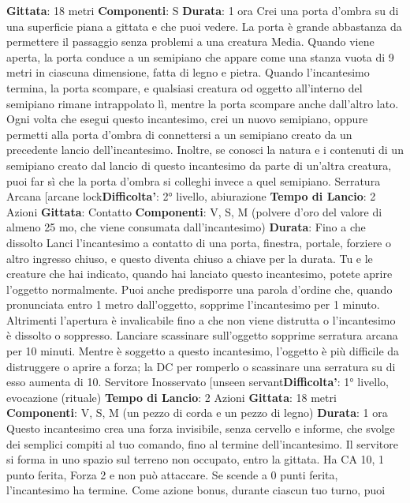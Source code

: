 \begin{multicols}{2}
\textbf{Gittata}: 18 metri
\textbf{Componenti}: S
\textbf{Durata}: 1 ora
Crei una porta d’ombra su di una superficie piana a
gittata e che puoi vedere. La porta è grande
abbastanza da permettere il passaggio senza problemi
a una creatura Media. Quando viene aperta, la porta
conduce a un semipiano che appare come una stanza
vuota di 9 metri in ciascuna dimensione, fatta di legno e
pietra. Quando l’incantesimo termina, la porta
scompare, e qualsiasi creatura od oggetto all’interno del
semipiano rimane intrappolato lì, mentre la porta
scompare anche dall’altro lato.
Ogni volta che esegui questo incantesimo, crei un
nuovo semipiano, oppure permetti alla porta d’ombra di
connettersi a un semipiano creato da un precedente
lancio dell’incantesimo. Inoltre, se conosci la natura e i
contenuti di un semipiano creato dal lancio di questo
incantesimo da parte di un’altra creatura, puoi far sì che
la porta d’ombra si colleghi invece a quel semipiano.
Serratura Arcana
[arcane lock\textbf{Difficolta'}:
2° livello, abiurazione
\textbf{Tempo di Lancio}: 2 Azioni
\textbf{Gittata}: Contatto
\textbf{Componenti}: V, S, M (polvere d’oro del valore di
almeno 25 mo, che viene consumata dall’incantesimo)
\textbf{Durata}: Fino a che dissolto
Lanci l’incantesimo a contatto di una porta, finestra,
portale, forziere o altro ingresso chiuso, e questo
diventa chiuso a chiave per la durata. Tu e le creature
che hai indicato, quando hai lanciato questo
incantesimo, potete aprire l’oggetto normalmente. Puoi
anche predisporre una parola d’ordine che, quando
pronunciata entro 1 metro dall’oggetto, sopprime
l’incantesimo per 1 minuto. Altrimenti l’apertura è
invalicabile fino a che non viene distrutta o
l’incantesimo è dissolto o soppresso. Lanciare
scassinare sull’oggetto sopprime serratura arcana per
10 minuti.
Mentre è soggetto a questo incantesimo, l’oggetto è più
difficile da distruggere o aprire a forza; la DC per
romperlo o scassinare una serratura su di esso
aumenta di 10.
Servitore Inosservato
[unseen servant\textbf{Difficolta'}:
1° livello, evocazione (rituale)
\textbf{Tempo di Lancio}: 2 Azioni
\textbf{Gittata}: 18 metri
\textbf{Componenti}: V, S, M (un pezzo di corda e un pezzo di
legno)
\textbf{Durata}: 1 ora
Questo incantesimo crea una forza invisibile, senza
cervello e informe, che svolge dei semplici compiti al
tuo comando, fino al termine dell’incantesimo. Il
servitore si forma in uno spazio sul terreno non
occupato, entro la gittata. Ha CA 10, 1 punto ferita,
Forza 2 e non può attaccare. Se scende a 0 punti ferita,
l’incantesimo ha termine.
Come azione bonus, durante ciascun tuo turno, puoi

\end{multicols}
